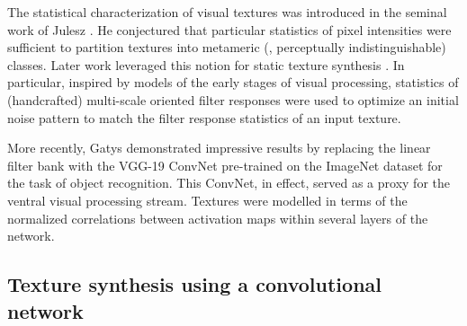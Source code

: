 The statistical characterization of visual textures was introduced
in the seminal work of Julesz \cite{julesz1962}.
He conjectured that particular statistics of pixel intensities
were sufficient to partition textures into metameric (\ie,
perceptually indistinguishable) classes. 
Later work leveraged this notion for static texture synthesis
\cite{heeger1995pyramid,portilla2000parametric}.
In particular, inspired by models of the early stages of visual 
processing, statistics of (handcrafted) multi-scale oriented filter 
responses were used to optimize an initial noise pattern 
to match the filter response statistics of an input texture.

More recently, Gatys \etal \cite{gatys2015} demonstrated
impressive results by replacing the linear filter bank with the VGG-19
\cite{simonyan2014very} ConvNet pre-trained on the ImageNet \cite{russakovsky2015} dataset for the task of object
recognition. This ConvNet, in effect, served as a proxy for the ventral visual
processing stream. 
Textures were modelled in terms of the normalized correlations between activation maps within several layers of the network.

\subsection{Texture synthesis using a convolutional network}
\label{sec:texture_synthesis_using_a_convnet}

